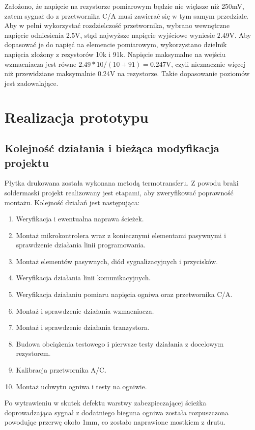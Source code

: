 \documentclass[polish,engineer]{polsl-msth}
\begin{document}
Założono, że napięcie na rezystorze pomiarowym będzie nie większe niż 250mV, zatem sygnał do z przetwornika C/A musi zawierać się w tym samym przedziale. Aby w pełni wykorzystać rozdzielczość przetwornika, wybrano wewnętrzne napięcie odniesienia 2.5V, stąd najwyższe napięcie wyjściowe wyniesie 2.49V. Aby dopasować je do napięć na elemencie pomiarowym, wykorzystano dzielnik napięcia złożony z rezystorów 10k i 91k. Napięcie maksymalne na wejściu wzmacniacza jest równe $2.49*10/(10+91) = 0.247$V, czyli nieznacznie więcej niż przewidziane maksymalnie 0.24V na rezystorze. Takie dopasowanie poziomów jest zadowalające.
\chapter{Realizacja prototypu}
\section{Kolejność działania i bieżąca modyfikacja projektu\label{section:przerobki}}
Płytka drukowana została wykonana metodą termotransferu. Z powodu braki soldermaski projekt realizowany jest etapami, aby zweryfikować poprawność montażu. Kolejność działań jest następująca:
\begin{enumerate}
    \item Weryfikacja i ewentualna naprawa ścieżek.
    \item Montaż mikrokontrolera wraz z koniecznymi elementami pasywnymi i sprawdzenie działania linii programowania.
    \item Montaż elementów pasywnych, diód sygnalizacyjnych i przycisków.
    \item Weryfikacja działania linii komunikacyjnych.
    \item Weryfikacja działaniu pomiaru napięcia ogniwa oraz przetwornika C/A.
    \item Montaż i sprawdzenie działania wzmacniacza.
    \item Montaż i sprawdzenie działania tranzystora.
    \item Budowa obciążenia testowego i pierwsze testy działania z docelowym rezystorem.
    \item Kalibracja przetwornika A/C.
    \item Montaż uchwytu ogniwa i testy na ogniwie.
\end{enumerate}
Po wytrawieniu w skutek defektu warstwy zabezpieczającej ścieżka doprowadzająca sygnał z dodatniego bieguna ogniwa została rozpuszczona powodując przerwę około 1mm, co zostało naprawione mostkiem z drutu.
\end{document}
